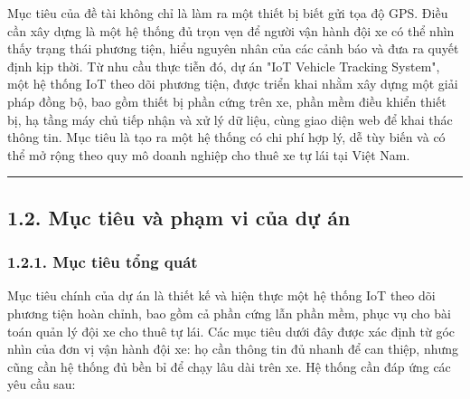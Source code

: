\documentclass[a4paper]{extarticle}
\begin{document}
Mục tiêu của đề tài không chỉ là làm ra một thiết bị biết gửi tọa độ
GPS. Điều cần xây dựng là một hệ thống đủ trọn vẹn để người vận hành đội
xe có thể nhìn thấy trạng thái phương tiện, hiểu nguyên nhân của các
cảnh báo và đưa ra quyết định kịp thời. Từ nhu cầu thực tiễn đó, dự án
"IoT Vehicle Tracking System", một hệ thống IoT theo dõi phương tiện,
được triển khai nhằm xây dựng một giải pháp đồng bộ, bao gồm thiết bị
phần cứng trên xe, phần mềm điều khiển thiết bị, hạ tầng máy chủ tiếp
nhận và xử lý dữ liệu, cùng giao diện web để khai thác thông tin. Mục
tiêu là tạo ra một hệ thống có chi phí hợp lý, dễ tùy biến và có thể mở
rộng theo quy mô doanh nghiệp cho thuê xe tự lái tại Việt Nam.

\begin{center}\rule{0.5\linewidth}{0.5pt}\end{center}

\subsection{1.2. Mục tiêu và phạm vi của dự
án}\label{12-mux1ee5c-tiuxeau-vuxe0-phux1ea1m-vi-cux1ee7a-dux1ef1-uxe1n}

\subsubsection{1.2.1. Mục tiêu tổng
quát}\label{121-mux1ee5c-tiuxeau-tux1ed5ng-quuxe1t}

Mục tiêu chính của dự án là thiết kế và hiện thực một hệ thống IoT theo
dõi phương tiện hoàn chỉnh, bao gồm cả phần cứng lẫn phần mềm, phục vụ
cho bài toán quản lý đội xe cho thuê tự lái. Các mục tiêu dưới đây được
xác định từ góc nhìn của đơn vị vận hành đội xe: họ cần thông tin đủ
nhanh để can thiệp, nhưng cũng cần hệ thống đủ bền bỉ để chạy lâu dài
trên xe. Hệ thống cần đáp ứng các yêu cầu sau:
\end{document}
